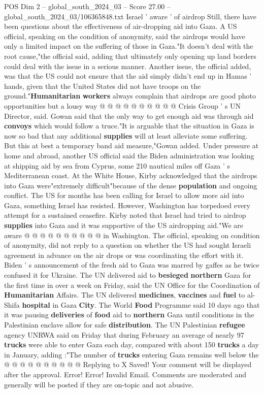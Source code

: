 \begin{textsample}{POS Dim 2 – global\_south\_2024\_03 – Score 27.00 – global\_south\_2024\_03/106365848.txt}
Israel ' aware ' of airdrop Still, there have been questions about the effectiveness of air-dropping aid into Gaza.
A US official, speaking on the condition of anonymity, said the airdrops would have only a limited impact on the suffering of those in Gaza."It doesn't deal with the root cause,"the official said, adding that ultimately only opening up land borders could deal with the issue in a serious manner.
Another issue, the official added, was that the US could not ensure that the aid simply didn't end up in Hamas ' hands, given that the United States did not have troops on the ground."\textbf{Humanitarian} \textbf{workers} always complain that airdrops are good photo opportunities but a lousy way @ @ @ @ @ @ @ @ @ @ Crisis Group ' s UN Director, said.
Gowan said that the only way to get enough aid was through aid \textbf{convoys} which would follow a truce."It is arguable that the situation in Gaza is now so bad that any additional \textbf{supplies} will at least alleviate some suffering.
But this at best a temporary band aid measure,"Gowan added.
Under pressure at home and abroad, another US official said the Biden administration was looking at shipping aid by sea from Cyprus, some 210 nautical miles off Gaza ' s Mediterranean coast.
At the White House, Kirby acknowledged that the airdrops into Gaza were"extremely difficult"because of the dense \textbf{population} and ongoing conflict.
The US for months has been calling for Israel to allow more aid into Gaza, something Israel has resisted.
However, Washington has torpedoed every attempt for a sustained ceasefire.
Kirby noted that Israel had tried to airdrop \textbf{supplies} into Gaza and it was supportive of the US airdropping aid."We are aware @ @ @ @ @ @ @ @ @ @ in Washington.
The official, speaking on condition of anonymity, did not reply to a question on whether the US had sought Israeli agreement in advance on the air drops or was coordinating the effort with it.
Biden ' s announcement of the fresh aid to Gaza was marred by gaffes as he twice confused it for Ukraine.
The UN delivered aid to \textbf{besieged} \textbf{northern} Gaza for the first time in over a week on Friday, said the UN Office for the Coordination of \textbf{Humanitarian} Affairs.
The UN delivered \textbf{medicines}, \textbf{vaccines} and \textbf{fuel} to al-Shifa \textbf{hospital} in Gaza \textbf{City}.
The World \textbf{Food} Programme said 10 days ago that it was pausing \textbf{deliveries} of \textbf{food} aid to \textbf{northern} Gaza until conditions in the Palestinian enclave allow for safe \textbf{distribution}.
The UN Palestinian \textbf{refugee} agency UNRWA said on Friday that during February an average of nearly 97 \textbf{trucks} were able to enter Gaza each day, compared with about 150 \textbf{trucks} a day in January, adding :"The number of \textbf{trucks} entering Gaza remains well below the @ @ @ @ @ @ @ @ @ @ Replying to X Saved!
Your comment will be displayed after the approval.
Error!
Error!
Invalid Email.
Comments are moderated and generally will be posted if they are on-topic and not abusive.


\end{textsample}
